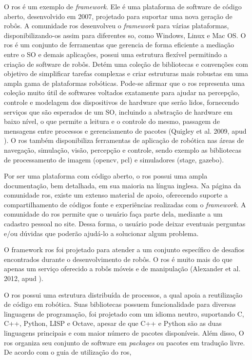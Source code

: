O \gls*{ros} é um exemplo de \textit{framework}. Ele é uma plataforma de software de código aberto, desenvolvido em 2007, projetado para suportar uma nova geração de robôs. A comunidade \gls*{ros} desenvolveu o \textit{framework} para várias plataformas, disponibilizando-os assim para diferentes \gls*{so}, como Windows, Linux e Mac OS. O \gls*{ros} é um conjunto de ferramentas que gerencia de forma eficiente  a mediação entre o SO e demais aplicações, possui uma estrutura flexível permitindo a criação de software de robôs. Detém uma coleção de bibliotecas e convenções com objetivo de simplificar tarefas complexas e criar estruturas mais robustas em uma ampla gama de plataformas robóticas. Pode-se afirmar que o \gls*{ros} representa uma coleção muito útil de softwares voltados exatamente para ajudar na percepção, controle e modelagem dos dispositivos de hardware que serão lidos, fornecendo serviços que são esperados de um SO, incluindo a abstração de hardware em baixo nível, o que permite a leitura e o controle do mesmo, passagem de mensagens entre processos e gerenciamento de pacotes (Quigley et al. 2009, apud ). O \gls*{ros} também disponibiliza ferramentas de aplicação de robótica nas áreas de navegação, simulação, visão, percepção e controle, sendo exemplo as bibliotecas de processamento de imagem (opencv, pcl) e simuladores (stage, gazebo).

Por ser uma plataforma com código aberto, o \gls*{ros} possui uma ampla documentação, bem detalhada, em sua maioria na língua inglesa. Na página da comunidade \gls*{ros}, existe um extenso material de apoio, oferecendo suporte a compartilhamento de códigos fonte e experiências realizadas com o \textit{framework}. A comunidade do \gls*{ros} permite que o usuário faça parte dela, mediante a um cadastro pessoal no site. Dessa forma, o usuário pode deixar eventuais perguntas e/ou dúvidas que poderão ajudá-lo a solucionar algum problema.

O framework \gls*{ros} foi projetado para atender a um conjunto específico de desafios encontrados durante o desenvolvimento de robôs. O \gls*{ros} é muito mais do que apenas um serviço oferecido a robôs móveis e de manipulação (Alexander et al. 2012, apud ).

O \gls*{ros} possui uma estrutura distribuída de processos, a qual apoia a reutilização de código em robótica. Suas bibliotecas possuem funcionalidade para diversas linguagens de programação, foi projetado com um idioma neutro, suportando C, C++, Python, LISP e Octave, apesar de que C++ e Python são as duas linguagens principais e com maior número de pacotes disponíveis. Além disso, O \gls*{ros} organiza seu conjunto de software em \textit{packages} ou pacotes em tradução livre. De acordo com o guia de utilização do \gls*{ros},

